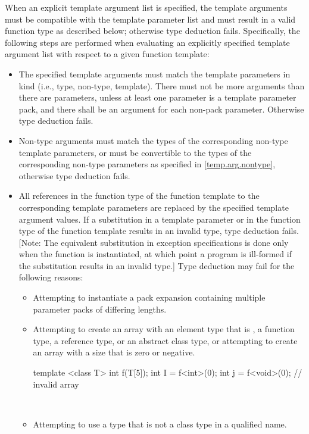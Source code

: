\documentclass[american]{book}
\begin{document}
\begin{paras}
\pnum
When an explicit template argument list is specified, the template
arguments must be compatible with the template parameter list and must
result in a valid function type as described below; otherwise type
deduction fails.  Specifically, the following steps are performed when
evaluating an explicitly specified template argument list with respect
to a given function template:

\begin{itemize}
\item
The specified template arguments must match the template parameters in
kind (i.e., type, non-type, template). There must not be more
arguments than there are parameters, unless at least one parameter is
a template parameter pack, and there shall be an argument for each
non-pack parameter. Otherwise type deduction fails.
\item
Non-type arguments must match the types of the corresponding non-type
template parameters, or must be convertible to the types of the
corresponding non-type parameters as specified in
\ref{temp.arg.nontype}, otherwise type deduction fails.
\item
All references in the function type  of the function template to the
corresponding template parameters are replaced by the specified
template argument values.  If a substitution in a template
parameter
or in the function type of the function template results in an invalid
type, type deduction fails.  [Note: The equivalent substitution in
exception specifications is done only when the function is
instantiated, at which point a program is ill-formed if the
substitution results in an invalid type.] Type deduction may fail for
the following reasons:

\begin{itemize}
\item
Attempting to instantiate a pack expansion containing
multiple parameter packs of differing lengths.

\item
Attempting to create an array with an element type that is , a
function type, a reference type, or an abstract class type, or attempting
to create an array with a size that is zero or negative.
\enterexample\ 

\begin{codeblock}
template <class T> int f(T[5]);
int I = f<int>(0);
int j = f<void>(0);             // invalid array
\end{codeblock}
\exitexample\ 
\item
Attempting to use a type that is not a class type in a qualified name.
\enterexample\ 


\end{itemize}
\end{itemize}
\end{paras}
\end{document}
